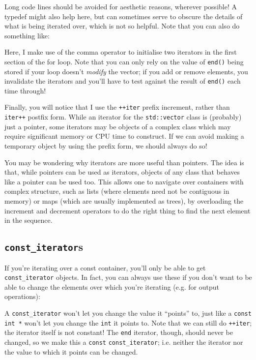\documentclass[a4paper]{scrartcl}
\begin{document}


Long code lines should be avoided for aesthetic reasons, wherever possible! A typedef might also help here, but can sometimes serve to obscure the details of what is being iterated over, which is not so helpful. Note that you can also do something like:



Here, I make use of the comma operator to initialise two iterators in the first section of the for loop. Note that you can only rely on the value of \verb|end()| being stored if your loop doesn't \emph{modify} the vector; if you add or remove elements, you invalidate the iterators and you'll have to test against the result of \verb|end()| each time through!

Finally, you will notice that I use the \verb|++iter| prefix increment, rather than \verb|iter++| postfix form. While an iterator for the \verb|std::vector| class is (probably) just a pointer, some iterators may be objects of a complex class which may require significant memory or CPU time to construct. If we can avoid making a temporary object by using the prefix form, we should always do so!

You may be wondering why iterators are more useful than pointers. The idea is that, while pointers can be used as iterators, objects of any class that behaves like a pointer can be used too. This allows one to navigate over containers with complex structure, such as lists (where elements need not be contiguous in memory) or maps (which are usually implemented as trees), by overloading the increment and decrement operators to do the right thing to find the next element in the sequence.

\subsection{\texttt{const\_iterator}s}
If you're iterating over a const container, you'll only be able to get \verb|const_iterator| objects. In fact, you can always use these if you don't want to be able to change the elements over which you're iterating (e.g. for output operations):



A \verb|const_iterator| won't let you change the value it ``points'' to, just like a \verb|const int *| won't let you change the \verb|int| it points to. Note that we can still do \verb|++iter|; the iterator itself is not constant! The \verb|end| iterator, though, should never be changed, so we make this a \verb|const| \verb|const_iterator|; i.e. neither the iterator nor the value to which it points can be changed.
\end{document}
